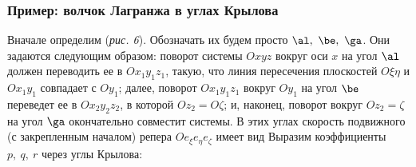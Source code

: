 \subsubsection{Пример: волчок Лагранжа в углах Крылова}

Вначале определим  (\emph{рис. 6}). Обозначать их
будем просто $\al,\ \be,\ \ga$. Они задаются следующим образом:
поворот системы $Oxyz$ вокруг оси $x$ на угол $\al$ должен
переводить ее в $Ox_1y_1z_1$, такую, что линия пересечения
плоскостей $O\xi\eta$ и $Ox_1y_1$ совпадает с $Oy_1$; далее, поворот
$Ox_1y_1z_1$ вокруг $Oy_1$ на угол $\be$ переведет ее в
$Ox_2y_2z_2$, в которой $Oz_2=O\zeta$; и, наконец, поворот вокруг
$Oz_2=\zeta$ на угол $\ga$ окончательно совместит системы. В этих
углах скорость подвижного (с закрепленным началом) репера
$Oe_{\xi}e_{\eta}e_{\zeta}$ имеет вид
Выразим коэффициенты $p,\ q,\ r$ через углы Крылова:

